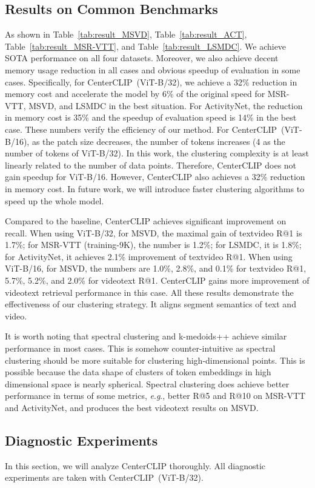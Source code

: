 \documentclass[sigconf]{acmart}
\newcommand{\eg}{\textit{e}.\textit{g}.}
\begin{document}
\subsection{Results on Common Benchmarks}
As shown in Table~\ref{tab:result_MSVD}, Table~\ref{tab:result_ACT}, 
Table~\ref{tab:result_MSR-VTT}, and Table~\ref{tab:result_LSMDC}.
We achieve SOTA performance on all four datasets.
Moreover, we also achieve decent memory usage reduction in all
cases and obvious speedup of evaluation in some cases.
Specifically, for CenterCLIP~(ViT-B/32),
we achieve a 32\% reduction in memory cost and accelerate the
model by 6\% of the original speed for MSR-VTT, MSVD, and LSMDC in the best situation.
For ActivityNet, the reduction in memory cost is 35\% and the speedup of evaluation
speed is 14\% in the best case.
These numbers verify the efficiency of our method.
For CenterCLIP~(ViT-B/16),
as the patch size decreases, the number of tokens increases
(4  as the number of tokens of ViT-B/32).
In this work, 
the clustering complexity is at least linearly related to the number
of data points.
Therefore, CenterCLIP does not gain speedup for ViT-B/16.
However, CenterCLIP also achieves a 32\% reduction in memory cost.
In future work, we will introduce faster clustering algorithms
to speed up the whole model.


Compared to the baseline, CenterCLIP
achieves significant improvement on recall.
When using ViT-B/32,
for MSVD, the maximal gain of textvideo R@1 is 1.7\%;
for MSR-VTT (\textsf{training-9K}), the number is 1.2\%;
for LSMDC, it is 1.8\%;
for ActivityNet, it achieves  2.1\% improvement of textvideo R@1.
When using ViT-B/16,
for MSVD, the numbers are 1.0\%, 2.8\%, and 0.1\% for textvideo R@1,
5.7\%, 5.2\%, and 2.0\% for videotext R@1.
CenterCLIP gains more improvement of videotext retrieval performance in this case.
All these results demonstrate the effectiveness of our clustering strategy.
It aligns segment semantics of text and video.

It is worth noting that spectral clustering and k-medoids++ achieve similar performance
in most cases.
This is somehow counter-intuitive as spectral clustering should be more suitable
for clustering high-dimensional points.
This is possible because the data shape of clusters of token embeddings in high dimensional space is
nearly spherical.
Spectral clustering does achieve better performance in terms of some metrics,
\eg, better R@5 and R@10 on MSR-VTT and ActivityNet,
and produces the best videotext results on MSVD.

\subsection{Diagnostic Experiments}
In this section, we will analyze CenterCLIP thoroughly.
All diagnostic experiments are taken with CenterCLIP~(ViT-B/32).
\end{document}
